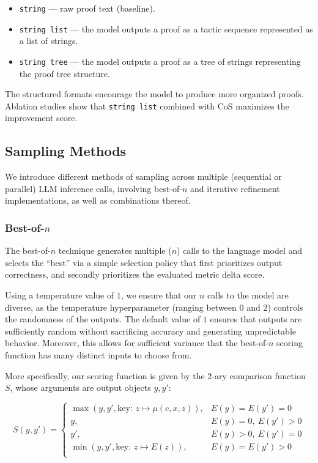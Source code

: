 \begin{itemize}
    \item \verb|string| --- raw proof text (baseline).
    \item \verb|string list| --- the model outputs a proof as a tactic sequence represented as a list of strings.
    \item \verb|string tree| --- the model outputs a proof as a tree of strings representing the proof tree structure.
\end{itemize}

The structured formats encourage the model to produce more organized proofs. Ablation studies show that \verb|string list| combined with CoS maximizes the improvement score.

\subsection{Sampling Methods}
\label{ssec:improver_sampling}

We introduce different methods of sampling across multiple (sequential or parallel) LLM inference calls, involving best-of-$n$ and iterative refinement implementations, as well as combinations thereof.

\subsubsection{Best-of-$n$}

The best-of-$n$ technique generates multiple ($n$) calls to the language model and selects the ``best'' via a simple selection policy that first prioritizes output correctness, and secondly prioritizes the evaluated metric delta score.

Using a temperature value of $1$, we ensure that our $n$ calls to the model are diverse, as the temperature hyperparameter (ranging between $0$ and $2$) controls the randomness of the outputs. The default value of $1$ ensures that outputs are sufficiently random without sacrificing accuracy and generating unpredictable behavior. Moreover, this allows for sufficient variance that the best-of-$n$ scoring function has many distinct inputs to choose from.

More specifically, our scoring function is given by the $2$-ary comparison function $S$, whose arguments are output objects $y,y'$:

\[S(y,y')=\begin{cases}
    \max(y,y',\text{key: } z\mapsto \mu(c,x,z)),&E(y)=E(y')=0\\
    y,&E(y)=0,\ E(y')>0\\
    y',&E(y)>0,\ E(y')=0\\
    \min(y,y',\text{key: } z\mapsto E(z)),&E(y)=E(y')>0\\
\end{cases}\]

